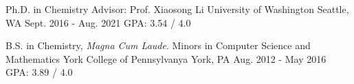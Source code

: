 

\begin{cventries}

  \cventry
    {Ph.D. in Chemistry\newline
    Advisor: Prof. Xiaosong Li}%
    {University of Washington} %
    {Seattle, WA} %
    {Sept. 2016 - Aug. 2021} %
    {GPA: 3.54 / 4.0} %



  \cventry
    {B.S. in Chemistry, \emph{Magna Cum Laude}. Minors in Computer Science and Mathematics} %
    {York College of Pennsylvanya} %
    {York, PA} %
    {Aug. 2012 - May 2016} %
    {GPA: 3.89 / 4.0} %

\end{cventries}

